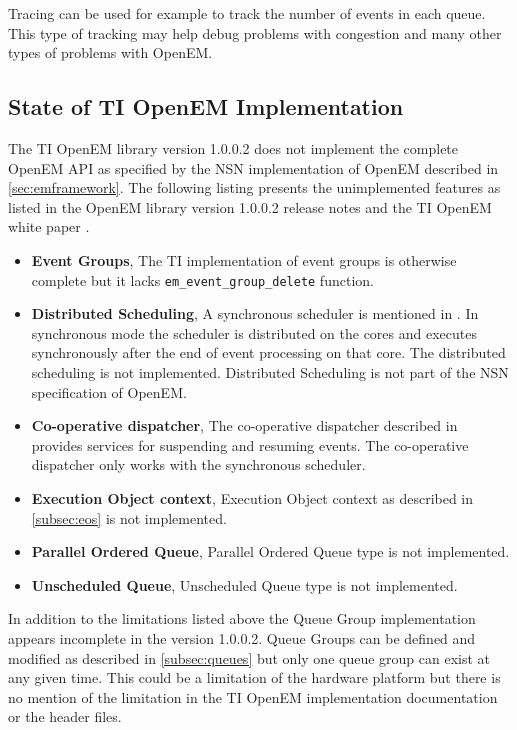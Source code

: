 Tracing can be used for example to track the number of events in each queue. This type of tracking may help debug problems with congestion and many other types of problems with OpenEM.

\subsection{State of TI OpenEM Implementation}
The TI OpenEM library version 1.0.0.2 does not implement the complete OpenEM API as specified by the NSN implementation of OpenEM described in \ref{sec:emframework}. The following listing presents the unimplemented features as listed in the OpenEM library version 1.0.0.2 release notes \cite{openemnotes} and the TI OpenEM white paper \cite{openemwhite}.

\begin{itemize}
    \item \textbf{Event Groups},
        The TI implementation of event groups is otherwise complete but it lacks \texttt{em\_event\_group\_delete} function.
    \item \textbf{Distributed Scheduling},
        A synchronous scheduler is mentioned in \cite{openemwhite}. In synchronous mode the scheduler is distributed on the cores and executes synchronously after the end of event processing on that core. The distributed scheduling is not implemented. Distributed Scheduling is not part of the NSN specification of OpenEM.
    \item \textbf{Co-operative dispatcher},
        The co-operative dispatcher described in \cite{openemwhite} provides services for suspending and resuming events. The co-operative dispatcher only works with the synchronous scheduler.
    \item \textbf{Execution Object context},
        Execution Object context as described in \ref{subsec:eos} is not implemented.
    \item \textbf{Parallel Ordered Queue},
        Parallel Ordered Queue type is not implemented.
    \item \textbf{Unscheduled Queue},
        Unscheduled Queue type is not implemented.
\end{itemize}

In addition to the limitations listed above the Queue Group implementation appears incomplete in the version 1.0.0.2. Queue Groups can be defined and modified as described in \ref{subsec:queues} but only one queue group can exist at any given time. This could be a limitation of the hardware platform but there is no mention of the limitation in the TI OpenEM implementation documentation or the header files.

